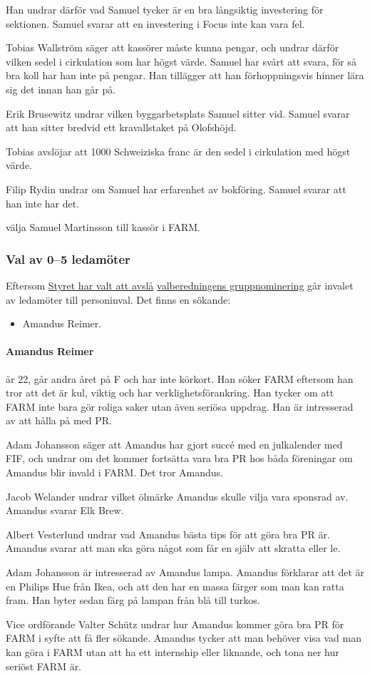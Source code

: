 \documentclass[hidelinks]{sektionsmote} %
\begin{document}
Han undrar därför vad Samuel tycker är en bra långsiktig investering för sektionen.
Samuel svarar att en investering i Focus inte kan vara fel.\par
Tobias Wallström säger att kassörer måste kunna pengar, och undrar därför vilken sedel i cirkulation som har högst värde.
Samuel har svårt att svara, för så bra koll har han inte på pengar.
Han tillägger att han förhoppningsvis hinner lära sig det innan han går på.\par
Erik Brusewitz undrar vilken byggarbetsplats Samuel sitter vid.
Samuel svarar att han sitter bredvid ett kravallstaket på Olofshöjd.\par
Tobias avslöjar att 1000 Schweiziska franc är den sedel i cirkulation med högst värde.\par
Filip Rydin undrar om Samuel har erfarenhet av bokföring.
Samuel svarar att han inte har det.

\begin{beslut}
  \item välja Samuel Martinsson till kassör i FARM.
\end{beslut}

\subsubsection{Val av 0--5 ledamöter}
Eftersom \hyperlink{bilagor/nomfarm-avslag.pdf.1}{Styret har valt att avslå} \hyperlink{bilagor/nomfarm.pdf.1}{valberedningens gruppnominering} går invalet av ledamöter till personinval.
Det finns en sökande:
\begin{itemize}
    \item Amandus Reimer.
\end{itemize}

\paragraph{Amandus Reimer} är 22, går andra året på F och har inte körkort.
Han söker FARM eftersom han tror att det är kul, viktig och har verklighetsförankring.
Han tycker om att FARM inte bara gör roliga saker utan även seriösa uppdrag.
Han är intresserad av att hålla på med PR.\par
Adam Johansson säger att Amandus har gjort succé med en julkalender med FIF, och undrar om det kommer fortsätta vara bra PR hos båda föreningar om Amandus blir invald i FARM.
Det tror Amandus.\par
Jacob Welander undrar vilket ölmärke Amandus skulle vilja vara sponsrad av.
Amandus svarar Elk Brew.\par
Albert Vesterlund undrar vad Amandus bästa tips för att göra bra PR är.
Amandus svarar att man ska göra något som får en själv att skratta eller le.\par
Adam Johansson är intresserad av Amandus lampa.
Amandus förklarar att det är en Philips Hue från Ikea, och att den har en massa färger som man kan ratta fram.
Han byter sedan färg på lampan från blå till turkos.\par
Vice ordförande Valter Schütz undrar hur Amandus kommer göra bra PR för FARM i syfte att få fler sökande.
Amandus tycker att man behöver visa vad man kan göra i FARM utan att ha ett internship eller liknande, och tona ner hur seriöst FARM är.
\end{document}
